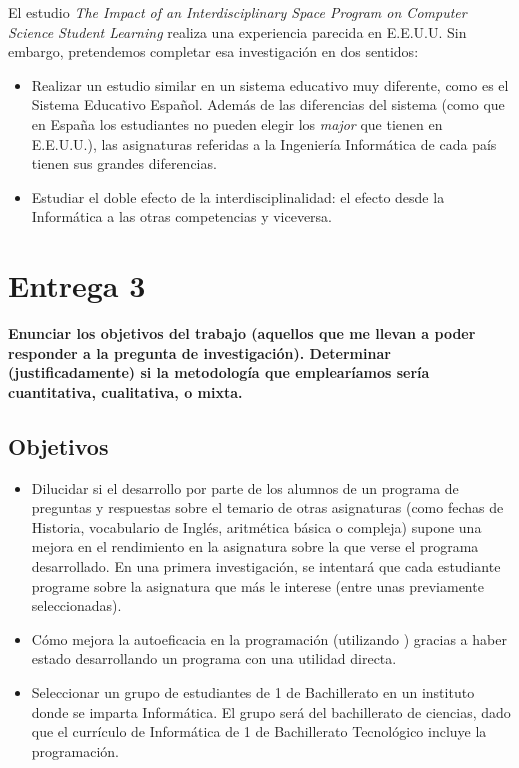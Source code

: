 \documentclass[palatino]{apuntesURJC}
\begin{document}
El estudio \textit{The Impact of an Interdisciplinary Space Program on Computer Science Student Learning} \cite{Interdiscipline} realiza una experiencia parecida en E.E.U.U. Sin embargo, pretendemos completar esa investigación en dos sentidos: 
\begin{itemize}
	\item Realizar un estudio similar en un sistema educativo muy diferente, como es el Sistema Educativo Español. 
	Además de las diferencias del sistema (como que en España los estudiantes no pueden elegir los \textit{major} que tienen en E.E.U.U.), las asignaturas referidas a la Ingeniería Informática de cada país tienen sus grandes diferencias.
	\item Estudiar el doble efecto de la interdisciplinalidad: el efecto desde la Informática a las otras competencias y viceversa.
\end{itemize}



\chapter{Entrega 3}

\textbf{Enunciar los objetivos del trabajo (aquellos que me llevan a poder responder a la pregunta de investigación).
%
Determinar (justificadamente) si la metodología que emplearíamos sería cuantitativa, cualitativa, o mixta.}

\section{Objetivos}

\begin{itemize}
	\item Dilucidar si el desarrollo por parte de los alumnos de un programa de preguntas y respuestas sobre el temario de otras asignaturas (como fechas de Historia, vocabulario de Inglés, aritmética básica o compleja) supone una mejora en el rendimiento en la asignatura sobre la que verse el programa desarrollado.
	\subitem En una primera investigación, se intentará que cada estudiante programe sobre la asignatura que más le interese (entre unas previamente seleccionadas).
	\item Cómo mejora la autoeficacia en la programación (utilizando   \cite{CPSES}) gracias a haber estado desarrollando un programa con una utilidad directa.
	\item Seleccionar un grupo de estudiantes de 1 de Bachillerato en un instituto donde se imparta Informática. 
	El grupo será del bachillerato de ciencias, dado que el currículo de Informática de 1 de Bachillerato Tecnológico incluye la programación.

\end{itemize}
\end{document}
